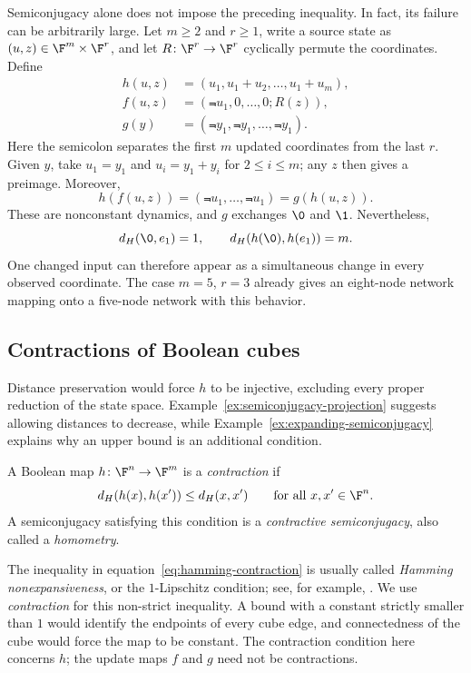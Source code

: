 \begin{example}\label{ex:expanding-semiconjugacy}
    Semiconjugacy alone does not impose the preceding inequality. In fact, its failure can be arbitrarily large. Let $m\ge2$ and $r\ge1$, write a source state as $(u,z)\in\F^m\times\F^r$, and let $R\colon\F^r\to\F^r$ cyclically permute the coordinates. Define
    \begin{align*}
        h(u,z)&=(u_1,u_1+u_2,\dots,u_1+u_m),\\
        f(u,z)&=(\Not{u}_1,0,\dots,0;R(z)),\\
        g(y)&=(\Not{y}_1,\Not{y}_1,\dots,\Not{y}_1).
    \end{align*}
    Here the semicolon separates the first $m$ updated coordinates from the last $r$. Given $y$, take $u_1=y_1$ and $u_i=y_1+y_i$ for $2\le i\le m$; any $z$ then gives a preimage. Moreover,
    \[
        h(f(u,z))=(\Not{u}_1,\dots,\Not{u}_1)=g(h(u,z)).
    \]
    These are nonconstant dynamics, and $g$ exchanges $\0$ and $\1$. Nevertheless,
    \[
        d_H(\0,e_1)=1,
        \qquad d_H(h(\0),h(e_1))=m.
    \]
    One changed input can therefore appear as a simultaneous change in every observed coordinate. The case $m=5$, $r=3$ already gives an eight-node network mapping onto a five-node network with this behavior.
\end{example}

\subsection{Contractions of Boolean cubes}

Distance preservation would force $h$ to be injective, excluding every proper reduction of the state space. Example~\ref{ex:semiconjugacy-projection} suggests allowing distances to decrease, while Example~\ref{ex:expanding-semiconjugacy} explains why an upper bound is an additional condition.

\begin{definition}\label{def:boolean-contraction}
    A Boolean map $h\colon\F^n\to\F^m$ is a \emph{contraction} if
    \begin{equation}\label{eq:hamming-contraction}
        d_H(h(x),h(x'))\le d_H(x,x')
        \qquad\text{for all }x,x'\in\F^n.
    \end{equation}
    A semiconjugacy satisfying this condition is a \emph{contractive semiconjugacy}, also called a \emph{homometry}.
\end{definition}

The inequality in equation~\eqref{eq:hamming-contraction} is usually called \emph{Hamming nonexpansiveness}, or the $1$-Lipschitz condition; see, for example, \cite{richard2011nonexpansive}. We use \emph{contraction} for this non-strict inequality. A bound with a constant strictly smaller than $1$ would identify the endpoints of every cube edge, and connectedness of the cube would force the map to be constant. The contraction condition here concerns $h$; the update maps $f$ and $g$ need not be contractions.

